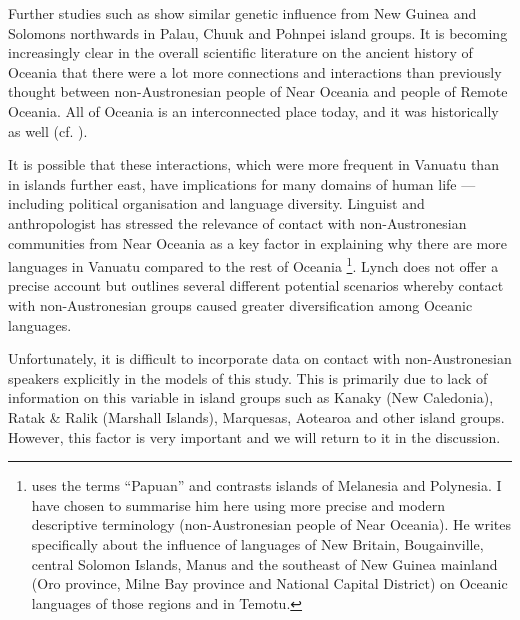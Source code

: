 \documentclass[unnumsec,webpdf,modern,medium]{oup-authoring-template}
\begin{document}
Further studies such as \citet{liu2022ancient} show similar genetic influence from New Guinea and Solomons northwards in Palau, Chuuk and Pohnpei island groups. It is becoming increasingly clear in the overall scientific literature on the ancient history of Oceania that there were a lot more connections and interactions than previously thought between non-Austronesian people of Near Oceania and people of Remote Oceania. All of Oceania is an interconnected place today, and it was historically as well (cf. \citet{hauofa_1993}).

It is possible that these interactions, which were more frequent in Vanuatu than in islands further east, have implications for many domains of human life --- including political organisation and language diversity. Linguist and anthropologist \citet[104]{lynch1981melanesian} has stressed the relevance of contact with non-Austronesian communities from Near Oceania as a key factor in explaining why there are more languages in Vanuatu compared to the rest of Oceania \footnote{\citet{lynch1981melanesian} uses the terms ``Papuan'' and contrasts islands of Melanesia and Polynesia. I have chosen to summarise him here using more precise and modern descriptive terminology (non-Austronesian people of Near Oceania). He writes specifically about the influence of languages of New Britain, Bougainville, central Solomon Islands, Manus and the southeast of New Guinea mainland (Oro province, Milne Bay province and National Capital District) on Oceanic languages of those regions and in Temotu.}. Lynch does not offer a precise account but outlines several different potential scenarios whereby contact with non-Austronesian groups caused greater diversification among Oceanic languages.

Unfortunately, it is difficult to incorporate data on contact with non-Austronesian speakers explicitly in the models of this study. This is primarily due to lack of information on this variable in island groups such as Kanaky (New Caledonia), Ratak \& Ralik (Marshall Islands), Marquesas, Aotearoa and other island groups. However, this factor is very important and we will return to it in the discussion.



\end{document}
